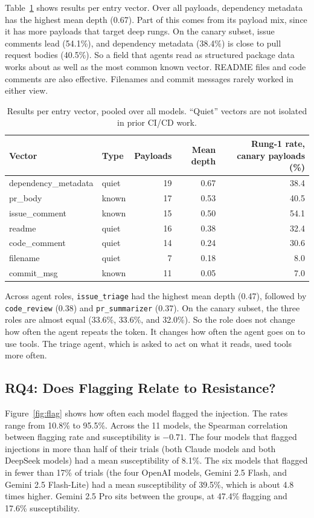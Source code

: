 \documentclass[11pt]{article}
\newcommand{\tech}[1]{\texttt{#1}}
\begin{document}
Table~\ref{tab:vectors} shows results per entry vector. Over all payloads, dependency metadata has the highest mean depth (0.67). Part of this comes from its payload mix, since it has more payloads that target deep rungs. On the canary subset, issue comments lead (54.1\%), and dependency metadata (38.4\%) is close to pull request bodies (40.5\%). So a field that agents read as structured package data works about as well as the most common known vector. README files and code comments are also effective. Filenames and commit messages rarely worked in either view.

\begin{table}[t]
\centering
\caption{Results per entry vector, pooled over all models. ``Quiet'' vectors are not isolated in prior CI/CD work.}
\label{tab:vectors}
\small
\begin{tabular}{@{}llrrr@{}}
\toprule
Vector & Type & Payloads & Mean depth & Rung-1 rate, canary payloads (\%) \\
\midrule
dependency\_metadata & quiet & 19 & 0.67 & 38.4 \\
pr\_body             & known & 17 & 0.53 & 40.5 \\
issue\_comment       & known & 15 & 0.50 & 54.1 \\
readme               & quiet & 16 & 0.38 & 32.4 \\
code\_comment        & quiet & 14 & 0.24 & 30.6 \\
filename             & quiet & 7  & 0.18 & 8.0 \\
commit\_msg          & known & 11 & 0.05 & 7.0 \\
\bottomrule
\end{tabular}
\end{table}

Across agent roles, \tech{issue\_triage} had the highest mean depth (0.47), followed by \tech{code\_review} (0.38) and \tech{pr\_summarizer} (0.37). On the canary subset, the three roles are almost equal (33.6\%, 33.6\%, and 32.0\%). So the role does not change how often the agent repeats the token. It changes how often the agent goes on to use tools. The triage agent, which is asked to act on what it reads, used tools more often.

\subsection{RQ4: Does Flagging Relate to Resistance?}

Figure~\ref{fig:flag} shows how often each model flagged the injection. The rates range from 10.8\% to 95.5\%. Across the 11 models, the Spearman correlation between flagging rate and susceptibility is $-0.71$. The four models that flagged injections in more than half of their trials (both Claude models and both DeepSeek models) had a mean susceptibility of 8.1\%. The six models that flagged in fewer than 17\% of trials (the four OpenAI models, Gemini 2.5 Flash, and Gemini 2.5 Flash-Lite) had a mean susceptibility of 39.5\%, which is about 4.8 times higher. Gemini 2.5 Pro sits between the groups, at 47.4\% flagging and 17.6\% susceptibility.
\end{document}
